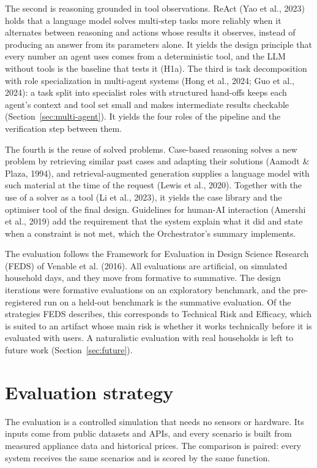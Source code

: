 \documentclass[12pt,a4paper]{report}
\begin{document}
The second is reasoning grounded in tool observations. ReAct (Yao et al.,
2023) holds that a language model solves multi-step tasks more reliably
when it alternates between reasoning and actions whose results it
observes, instead of producing an answer from its parameters alone. It
yields the design principle that every number an agent uses comes from a
deterministic tool, and the LLM without tools is the baseline that tests
it (H1a). The third is task decomposition with role specialization in
multi-agent systems (Hong et al., 2024; Guo et al., 2024): a task split
into specialist roles with structured hand-offs keeps each agent's
context and tool set small and makes intermediate results checkable
(Section~\ref{sec:multi-agent}). It yields the four roles of the pipeline
and the verification step between them.

The fourth is the reuse of solved problems. Case-based reasoning solves a
new problem by retrieving similar past cases and adapting their
solutions (Aamodt \& Plaza, 1994), and retrieval-augmented generation
supplies a language model with such material at the time of the request
(Lewis et al., 2020). Together with the use of a solver as a tool (Li et
al., 2023), it yields the case library and the optimiser tool of the
final design. Guidelines for human-AI interaction (Amershi et al., 2019)
add the requirement that the system explain what it did and state when
a constraint is not met, which the Orchestrator's summary implements.

The evaluation follows the Framework for Evaluation in Design Science
Research (FEDS) of Venable et al. (2016). All evaluations are artificial,
on simulated household days, and they move from formative to summative.
The design iterations were formative evaluations on an exploratory
benchmark, and the pre-registered run on a held-out benchmark is the
summative evaluation. Of the strategies FEDS describes, this corresponds
to Technical Risk and Efficacy, which is suited to an artifact whose main
risk is whether it works technically before it is evaluated with users.
A naturalistic evaluation with real households is left to future work
(Section~\ref{sec:future}).

\section{Evaluation strategy}
\label{sec:evaluation}

The evaluation is a controlled simulation that needs no sensors or
hardware. Its inputs come from public datasets and APIs, and every
scenario is built from measured appliance data and historical prices.
The comparison is paired: every system receives the same scenarios and
is scored by the same function.
\end{document}
